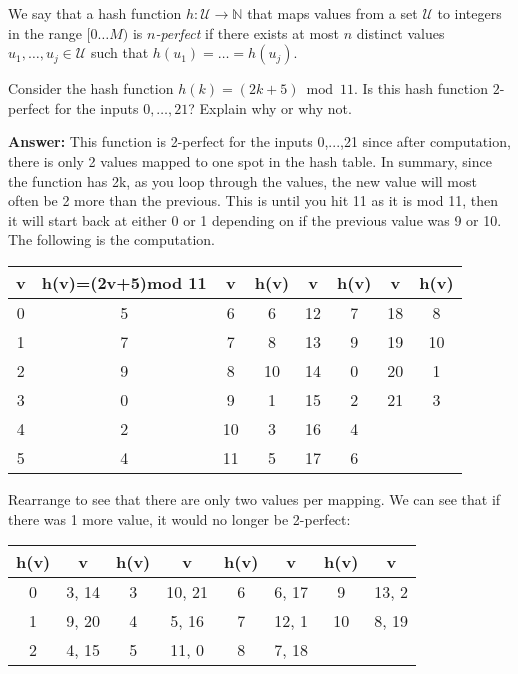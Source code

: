 \begin{problem}
We say that a hash function $h : \mathcal{U} \rightarrow \mathbb{N}$ that maps values from a set $\mathcal{U}$ to integers in the range $[0\dots M)$ is \emph{$n$-perfect} if there exists at most $n$ distinct values $u_1, \dots, u_j \in \mathcal{U}$ such that $h(u_1) = \dots = h(u_j)$.
\begin{questions}
\item Consider the hash function $h(k) = (2k + 5) \bmod 11$. Is this hash function $2$-perfect for the inputs $0, \dots, 21$? Explain why or why not.

\textbf{Answer:}
This function is 2-perfect for the inputs 0,...,21 since after computation, there is only 2 values mapped to one spot in the hash table. In summary, since the function has 2k, as you loop through the values, the new value will most often be 2 more than the previous. This is until you hit 11 as it is mod 11, then it will start back at either 0 or 1 depending on if the previous value was 9 or 10. The following is the computation.\\

\begin{center}
  \begin{tabular}{||c|c|c|c|c|c|c|c||} 
    \hline
    v & h(v)=(2v+5)mod 11 & v & h(v) & v & h(v) & v & h(v) \\ [0.5ex] 
    \hline\hline
    0 & 5 & 6 & 6 & 12 & 7 & 18 & 8\\ 
    1 & 7 & 7 & 8 & 13 & 9 & 19 & 10 \\
    2 & 9 & 8 & 10 & 14 & 0 & 20 & 1 \\
    3 & 0 & 9 & 1 & 15 & 2 & 21 & 3 \\
    4 & 2 & 10 & 3 & 16 & 4 &  & \\
    5 & 4 & 11 & 5 & 17 & 6 &  & \\ [1ex] 
    \hline
  \end{tabular}
\end{center}

Rearrange to see that there are only two values per mapping. We can see that if there was 1 more value, it would no longer be 2-perfect:

\begin{center}
  \begin{tabular}{||c|c|c|c|c|c|c|c||} 
    \hline
    h(v) & v & h(v) & v & h(v) & v & h(v) & v \\ [0.5ex] 
    \hline\hline
    0 & 3, 14 & 3 & 10, 21 & 6 & 6, 17 & 9 & 13, 2\\ 
    1 & 9, 20 & 4 & 5, 16 & 7 & 12, 1 & 10 & 8, 19 \\
    2 & 4, 15 & 5 & 11, 0 & 8 & 7, 18 &  &  \\ [1ex] 
    \hline
  \end{tabular}
\end{center}



\end{questions}
\end{problem}
